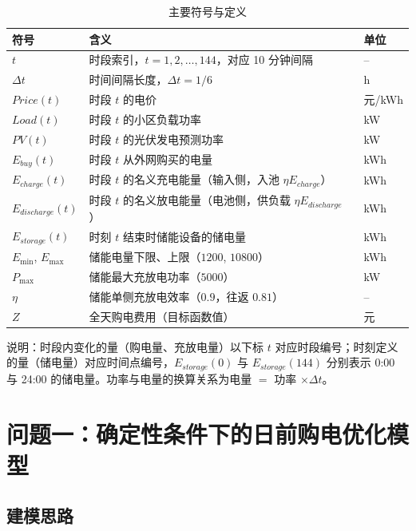 \documentclass[zihao=-4,a4paper,UTF8,fontset=none]{ctexart}
\begin{document}
\begin{table}[H]
  \centering
  \caption{主要符号与定义}
  \label{tab:symbols}
  \begin{tabularx}{0.92\textwidth}{C{0.22\textwidth}Y C{0.14\textwidth}}
    \toprule
    符号 & 含义 & 单位 \\
    \midrule
    $t$ & 时段索引，$t=1,2,\ldots,144$，对应 10 分钟间隔 & -- \\
    $\Delta t$ & 时间间隔长度，$\Delta t=1/6$ & h \\
    $Price(t)$ & 时段 $t$ 的电价 & 元/kWh \\
    $Load(t)$ & 时段 $t$ 的小区负载功率 & kW \\
    $PV(t)$ & 时段 $t$ 的光伏发电预测功率 & kW \\
    $E_{buy}(t)$ & 时段 $t$ 从外网购买的电量 & kWh \\
    $E_{charge}(t)$ & 时段 $t$ 的名义充电能量（输入侧，入池 $\eta E_{charge}$） & kWh \\
    $E_{discharge}(t)$ & 时段 $t$ 的名义放电能量（电池侧，供负载 $\eta E_{discharge}$） & kWh \\
    $E_{storage}(t)$ & 时刻 $t$ 结束时储能设备的储电量 & kWh \\
    $E_{\min}$, $E_{\max}$ & 储能电量下限、上限（$1200$, $10800$） & kWh \\
    $P_{\max}$ & 储能最大充放电功率（$5000$） & kW \\
    $\eta$ & 储能单侧充放电效率（$0.9$，往返 $0.81$） & -- \\
    $Z$ & 全天购电费用（目标函数值） & 元 \\
    \bottomrule
  \end{tabularx}
\end{table}

\noindent 说明：时段内变化的量（购电量、充放电量）以下标 $t$ 对应时段编号；时刻定义的量（储电量）对应时间点编号，$E_{storage}(0)$ 与 $E_{storage}(144)$ 分别表示 0:00 与 24:00 的储电量。功率与电量的换算关系为电量 $=$ 功率 $\times \Delta t$。

\section{问题一：确定性条件下的日前购电优化模型}

\subsection{建模思路}
\end{document}
